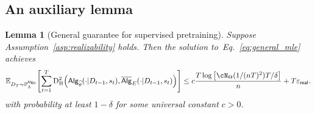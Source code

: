 \documentclass[10pt]{article}
\newtheorem{lemma}[theorem]{Lemma}
\renewcommand{\epsilon}{\varepsilon}
\newcommand{\<}{\left\langle}
\renewcommand{\>}{\right\rangle}
\newcommand{\paren}[1]{{\left( #1 \right)}}
\newcommand{\brac}[1]{{\left[ #1 \right]}}
\newcommand{\E}{\mathbb{E}}
\renewcommand{\P}{\mathbb{P}}
\newcommand{\HelDs}{{\mathrm{D}^2_{\mathrm{H}}}}
\newcommand{\state}{{s}}
\newcommand{\totlen}{{T}}
\newcommand{\sAlg}{{\mathsf{Alg}}}
\newcommand{\osAlg}{\overline{\mathsf{Alg}}}
\newcommand{\dset}{{D}}
\newcommand{\Numobs}{{n}}
\newcommand{\Parspace}{{\Theta}}
\newcommand{\EstPar}{{\widehat{\theta}}}
\newcommand{\prior}{{\Lambda}}
\newcommand{\shortexp}{{E}}
\newcommand{\geneps}{{\epsilon}_{\sf real}}
\begin{document}
\subsection{An auxiliary lemma}
\begin{lemma}[General guarantee for supervised pretraining]\label{lm:general_imit}
Suppose Assumption~\ref{asp:realizability} holds. Then  the solution to~Eq.~\eqref{eq:general_mle} achieves
\begin{align*}
\E_{\dset_\totlen\sim \P^{\sAlg_0}_\prior}\brac{ \sum_{t=1}^\totlen \HelDs\paren{ \sAlg_{{\EstPar}}(\cdot|\dset_{t-1},\state_t ), \osAlg_{\shortexp}(\cdot|\dset_{t-1},\state_t )} } \le c\frac{\totlen \log \brac{ \cN_{\Parspace}(1/(\Numobs\totlen)^2) \totlen/\delta } }{n} + \totlen\geneps.
\end{align*}
with probability at least $1-\delta$ for some universal constant $c>0$.
\end{lemma}
\end{document}
